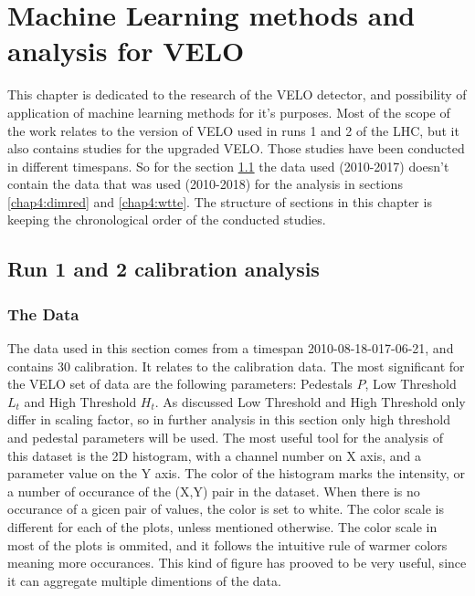 \chapter{Machine Learning methods and analysis for VELO}

This chapter is dedicated to the research of the VELO detector, and possibility of application of machine learning methods for it's purposes. Most of the scope of the work relates to the version of VELO used in runs 1 and 2 of the LHC, but it also contains studies for the upgraded VELO. Those studies have been conducted in different timespans. So for the section \ref{chap4:run12} the data used (2010-2017) doesn't contain the data that was used (2010-2018) for the analysis in sections \ref{chap4:dimred} and \ref{chap4:wtte}. The structure of sections in this chapter is keeping the chronological order of the conducted studies.

\section{Run 1 and 2 calibration analysis}
\label{chap4:run12}

\subsection{The Data}

The data used in this section comes from a timespan 2010-08-18-017-06-21, and contains 30 calibration.
It relates to the calibration data. The most significant for the VELO set of data are the following parameters: Pedestals $P$, Low Threshold $L_t$ and High Threshold $H_t$.
As discussed
Low Threshold and High Threshold only differ in scaling factor, so in further analysis in this section only high threshold and pedestal parameters will be used. 
The most useful tool for the analysis of this dataset is the 2D histogram, with a channel number on X axis, and a parameter value on the Y axis. The color of the histogram marks the intensity, or a number of occurance of the (X,Y) pair in the dataset. When there is no occurance of a gicen pair of values, the color is set to white. The color scale is different for each of the plots, unless mentioned otherwise. The color scale in most of the plots is ommited, and it follows the intuitive rule of warmer colors meaning more occurances.
This kind of figure has prooved to be very useful, since it can aggregate multiple dimentions of the data.

